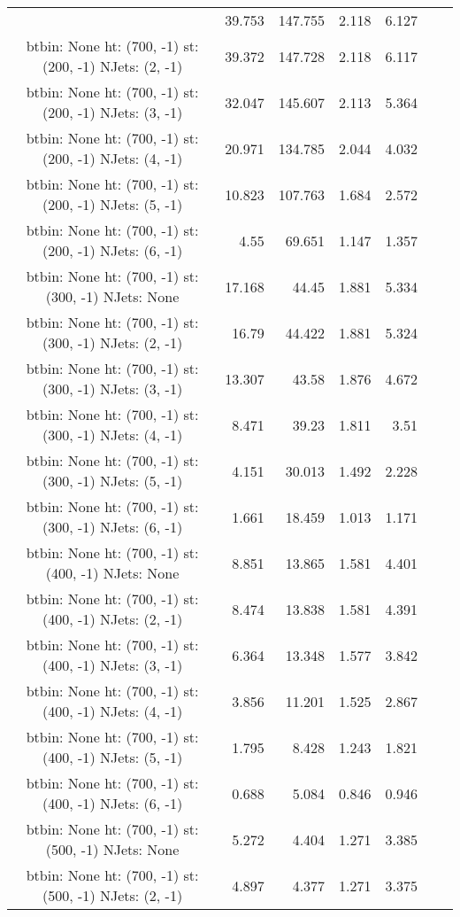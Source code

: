 \documentclass[12pt]{paper}
\begin{document}
\begin{landscape}
\begin{longtable}{c|r|r|r|r|r|r}
 & 39.753 & 147.755 & 2.118 & 6.127\\
btbin:  None ht:  (700, -1) st:  (200, -1) NJets:  (2, -1)
 & 39.372 & 147.728 & 2.118 & 6.117\\
btbin:  None ht:  (700, -1) st:  (200, -1) NJets:  (3, -1)
 & 32.047 & 145.607 & 2.113 & 5.364\\
btbin:  None ht:  (700, -1) st:  (200, -1) NJets:  (4, -1)
 & 20.971 & 134.785 & 2.044 & 4.032\\
btbin:  None ht:  (700, -1) st:  (200, -1) NJets:  (5, -1)
 & 10.823 & 107.763 & 1.684 & 2.572\\
btbin:  None ht:  (700, -1) st:  (200, -1) NJets:  (6, -1)
 & 4.55 & 69.651 & 1.147 & 1.357\\
btbin:  None ht:  (700, -1) st:  (300, -1) NJets:  None
 & 17.168 & 44.45 & 1.881 & 5.334\\
btbin:  None ht:  (700, -1) st:  (300, -1) NJets:  (2, -1)
 & 16.79 & 44.422 & 1.881 & 5.324\\
btbin:  None ht:  (700, -1) st:  (300, -1) NJets:  (3, -1)
 & 13.307 & 43.58 & 1.876 & 4.672\\
btbin:  None ht:  (700, -1) st:  (300, -1) NJets:  (4, -1)
 & 8.471 & 39.23 & 1.811 & 3.51\\
btbin:  None ht:  (700, -1) st:  (300, -1) NJets:  (5, -1)
 & 4.151 & 30.013 & 1.492 & 2.228\\
btbin:  None ht:  (700, -1) st:  (300, -1) NJets:  (6, -1)
 & 1.661 & 18.459 & 1.013 & 1.171\\
btbin:  None ht:  (700, -1) st:  (400, -1) NJets:  None
 & 8.851 & 13.865 & 1.581 & 4.401\\
btbin:  None ht:  (700, -1) st:  (400, -1) NJets:  (2, -1)
 & 8.474 & 13.838 & 1.581 & 4.391\\
btbin:  None ht:  (700, -1) st:  (400, -1) NJets:  (3, -1)
 & 6.364 & 13.348 & 1.577 & 3.842\\
btbin:  None ht:  (700, -1) st:  (400, -1) NJets:  (4, -1)
 & 3.856 & 11.201 & 1.525 & 2.867\\
btbin:  None ht:  (700, -1) st:  (400, -1) NJets:  (5, -1)
 & 1.795 & 8.428 & 1.243 & 1.821\\
btbin:  None ht:  (700, -1) st:  (400, -1) NJets:  (6, -1)
 & 0.688 & 5.084 & 0.846 & 0.946\\
btbin:  None ht:  (700, -1) st:  (500, -1) NJets:  None
 & 5.272 & 4.404 & 1.271 & 3.385\\
btbin:  None ht:  (700, -1) st:  (500, -1) NJets:  (2, -1)
 & 4.897 & 4.377 & 1.271 & 3.375\\

\end{longtable}
\end{landscape}
\end{document}
